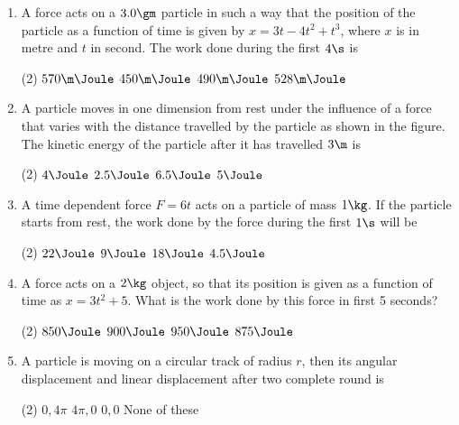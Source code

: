 \documentclass{article}
\begin{document}
\begin{enumerate}
\item A force acts on a $3.0\gm$ particle in such a way that the position of the particle as a function of time is given by $x=3t-4t^2+t^3$, where $x$ is in metre and $t$ in second. The work done during the first $4\s$ is
\begin{tasks}(2)
	\task $570\m\Joule$
	\task $450\m\Joule$
	\task $490\m\Joule$
	\task $528\m\Joule$\ans
\end{tasks}

\item A particle moves in one dimension from rest under the influence of a force that varies with the distance travelled by the particle as shown in the figure. The kinetic energy of the particle after it has travelled $3 \m$ is
\begin{center}
\end{center}
\begin{tasks}(2)
	\task $4\Joule$
	\task $2.5\Joule$
	\task $6.5\Joule$\ans
	\task $5\Joule$
\end{tasks}

\item A time dependent force $F = 6t$ acts on a particle of mass
$1 \kg$. If the particle starts from rest, the work done by the force during the first $1 \s$ will be
\begin{tasks}(2)
	\task $22\Joule$
	\task $9\Joule$
	\task $18\Joule$
	\task $4.5\Joule$\ans
\end{tasks}

\item A force acts on a $2 \kg$ object, so that its position is given as a function of time as $x = 3t^2 + 5$. What is the work done by this force in first 5 seconds?
\begin{tasks}(2)
	\task $850\Joule$ 
	\task $900\Joule$ \ans 
	\task $950\Joule$
	\task $875\Joule$
\end{tasks}




\item A particle is moving on a circular track of radius $r$, then its angular displacement and linear displacement after two complete round is
\begin{center}
\end{center}
\begin{tasks}(2)
	\task $0, 4\pi$
	\task $4\pi, 0$\ans
	\task $0, 0$
	\task None of these
\end{tasks}


\end{enumerate}
\end{document}
